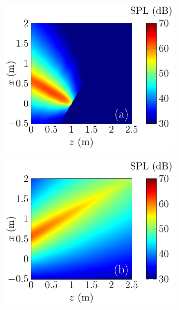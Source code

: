 \begin{figure}[!htb]
    \centering
    \begin{subfigure}{0.32\textwidth}
        \centering
        \includegraphics[width = \textwidth]{fig/ComputePalReflectionTruncated_Ultra100000_LocSurface1m_Absorp0_Orignal_211013Z.pdf}
    \end{subfigure}
    \begin{subfigure}{0.32\textwidth}
        \centering
        \includegraphics[width = \textwidth]{fig/ComputePalReflectionTruncated_Ultra100000_LocSurface1m_Absorp0_Image_211013Aa.pdf}

\end{subfigure}
\end{figure}
